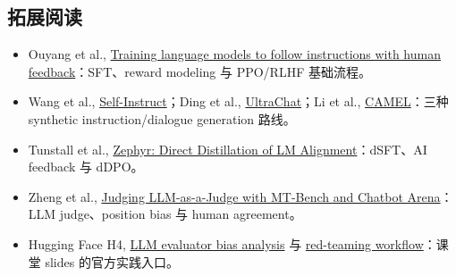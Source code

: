 \subsection{拓展阅读}

\begingroup
\scriptsize
\begin{itemize}[itemsep=0pt,topsep=0.15em,parsep=0pt]
  \item Ouyang et al., \href{https://arxiv.org/abs/2203.02155}{Training language models to follow instructions with human feedback}：SFT、reward modeling 与 PPO/RLHF 基础流程。
  \item Wang et al., \href{https://arxiv.org/abs/2212.10560}{Self-Instruct}；Ding et al., \href{https://arxiv.org/abs/2305.14233}{UltraChat}；Li et al., \href{https://arxiv.org/abs/2303.17760}{CAMEL}：三种 synthetic instruction/dialogue generation 路线。
  \item Tunstall et al., \href{https://arxiv.org/abs/2310.16944}{Zephyr: Direct Distillation of LM Alignment}：dSFT、AI feedback 与 dDPO。
  \item Zheng et al., \href{https://arxiv.org/abs/2306.05685}{Judging LLM-as-a-Judge with MT-Bench and Chatbot Arena}：LLM judge、position bias 与 human agreement。
  \item Hugging Face H4, \href{https://huggingface.co/blog/llm-leaderboard}{LLM evaluator bias analysis} 与 \href{https://huggingface.co/blog/red-teaming}{red-teaming workflow}：课堂 slides 的官方实践入口。
\end{itemize}
\endgroup


